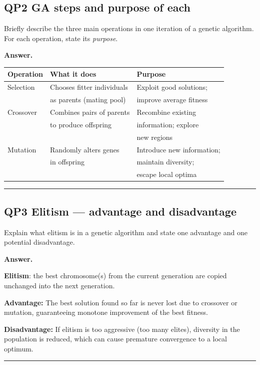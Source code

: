 \documentclass[11pt,a4paper]{article}
\newcommand{\Q}[2]{\subsection*{Q#1 \quad #2}}
\newenvironment{answer}{\medskip\textbf{Answer.}\par}{\bigskip\hrule\bigskip}
\begin{document}

\Q{P2}{[4 marks] GA steps and purpose of each}
Briefly describe the three main operations in one iteration of a genetic
algorithm.  For each operation, state its \emph{purpose}.

\begin{answer}
\begin{tabular}{@{}lll@{}}
  \toprule
  \textbf{Operation} & \textbf{What it does} & \textbf{Purpose} \\
  \midrule
  Selection & Chooses fitter individuals & Exploit good solutions; \\
            & as parents (mating pool) & improve average fitness \\[4pt]
  Crossover & Combines pairs of parents & Recombine existing \\
            & to produce offspring & information; explore \\
            &                      & new regions \\[4pt]
  Mutation  & Randomly alters genes & Introduce new information; \\
            & in offspring          & maintain diversity; \\
            &                       & escape local optima \\
  \bottomrule
\end{tabular}
\end{answer}


\Q{P3}{[2 marks] Elitism — advantage and disadvantage}
Explain what elitism is in a genetic algorithm and state one advantage
and one potential disadvantage.

\begin{answer}
\textbf{Elitism}: the best chromosome(s) from the current generation are
copied unchanged into the next generation.

\medskip
\textbf{Advantage:} The best solution found so far is never lost due to
crossover or mutation, guaranteeing monotone improvement of the best fitness.

\medskip
\textbf{Disadvantage:} If elitism is too aggressive (too many elites),
diversity in the population is reduced, which can cause premature convergence
to a local optimum.
\end{answer}

\end{document}
